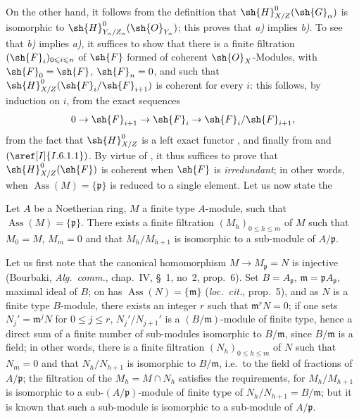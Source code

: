 \begin{proposition}[5.11.1]
On the other hand, it follows from the definition  that $\sh{H}^0_{X/Z}(\sh{G}_\alpha)$ is isomorphic to $\sh{H}^0_{Y_\alpha/Z_\alpha}(\sh{O}_{Y_\alpha})$; this proves that \emph{a)} implies \emph{b)}.
To see that \emph{b)} implies \emph{a)}, it suffices to show that there is a finite filtration $(\sh{F}_i)_{0\leqslant i\leqslant n}$ of $\sh{F}$ formed of coherent $\sh{O}_X$-Modules, with $\sh{F}_0=\sh{F}$, $\sh{F}_n=0$, and such that $\sh{H}^0_{X/Z}(\sh{F}_i/\sh{F}_{i+1})$ is coherent for every $i$: this follows, by induction on $i$, from the exact sequences
\[
  0\to\sh{F}_{i+1}\to\sh{F}_i\to\sh{F}_i/\sh{F}_{i+1},
\]
from the fact that $\sh{H}^0_{X/Z}$ is a left exact functor , and finally from  and $(\sref[I]{I.6.1.1})$.
By virtue of , it thus suffices to prove that $\sh{H}^0_{X/Z}(\sh{F})$ is coherent when $\sh{F}$ is \emph{irredundant}; in other words, when $\operatorname{Ass}(M)=\{\mathfrak{p}\}$ is reduced to a single element.
Let us now state the
\begin{lemma}[5.11.1.1]
\label{IV.5.11.1.1}
Let $A$ be a Noetherian ring, $M$ a finite type $A$-module, such that $\operatorname{Ass}(M)=\{\mathfrak{p}\}$.
There exists a finite filtration $(M_h)_{0\leqslant h\leqslant m}$ of $M$ such that $M_0=M$, $M_m=0$ and that $M_h/M_{h+1}$ is isomorphic to a sub-module of $A/\mathfrak{p}$.
\end{lemma}


Let us first note that the canonical homomorphism $M\to M_\mathfrak{p}=N$ is injective (Bourbaki, \emph{Alg.\ comm.}, chap.~IV, \S~1, no~2, prop.~6).
Set $B=A_\mathfrak{p}$, $\mathfrak{m}=\mathfrak{p}A_\mathfrak{p}$, maximal ideal of $B$; on has $\operatorname{Ass}(N)=\{\mathfrak{m}\}$ (\emph{loc.\ cit.}, prop.~5), and as $N$ is a finite type $B$-module,
there exists an integer $r$ such that $\mathfrak{m}^rN=0$; if one sets $N_j'=\mathfrak{m}^jN$ for $0\leqslant j\leqslant r$, $N_j'/N_{j+1}'$ is a $(B/\mathfrak{m})$-module of finite type, hence a direct sum of a finite number of sub-modules isomorphic to $B/\mathfrak{m}$, since $B/\mathfrak{m}$ is a field; in other words, there is a finite filtration $(N_h)_{0\leqslant h\leqslant m}$ of $N$ such that $N_m=0$ and that $N_h/N_{h+1}$ is isomorphic to $B/\mathfrak{m}$, i.e.\ to the field of fractions of $A/\mathfrak{p}$; the filtration of the $M_h=M\cap N_h$ satisfies the requirements, for $M_h/M_{h+1}$ is isomorphic to a sub-$(A/\mathfrak{p})$-module of finite type of $N_h/N_{h+1}=B/\mathfrak{m}$; but it is known that such a sub-module is isomorphic to a sub-module of $A/\mathfrak{p}$.


\end{proposition}
